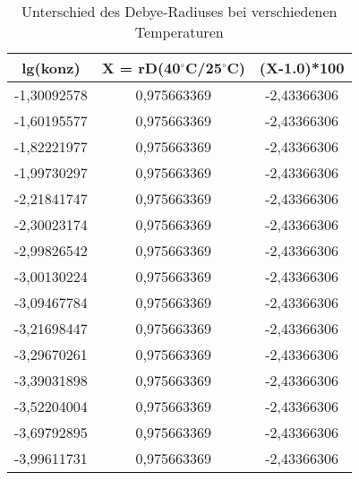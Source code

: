 \begin{table}[H]
  \centering
  \caption{Unterschied des Debye-Radiuses bei verschiedenen Temperaturen}
    \begin{tabular}{ccc}
    \toprule
    \multicolumn{1}{c}{\textbf{lg(konz)}} & \multicolumn{1}{p{6.785em}}{\textbf{\qquad X = \newline{}rD(40$^\circ$C/25$^\circ$C)}} & \multicolumn{1}{c}{\textbf{(X-1.0)*100}} \\
    \midrule
    -1,30092578 & 0,975663369 & -2,43366306 \\
    -1,60195577 & 0,975663369 & -2,43366306 \\
    -1,82221977 & 0,975663369 & -2,43366306 \\
    -1,99730297 & 0,975663369 & -2,43366306 \\
    -2,21841747 & 0,975663369 & -2,43366306 \\
    -2,30023174 & 0,975663369 & -2,43366306 \\
    -2,99826542 & 0,975663369 & -2,43366306 \\
    -3,00130224 & 0,975663369 & -2,43366306 \\
    -3,09467784 & 0,975663369 & -2,43366306 \\
    -3,21698447 & 0,975663369 & -2,43366306 \\
    -3,29670261 & 0,975663369 & -2,43366306 \\
    -3,39031898 & 0,975663369 & -2,43366306 \\
    -3,52204004 & 0,975663369 & -2,43366306 \\
    -3,69792895 & 0,975663369 & -2,43366306 \\
    -3,99611731 & 0,975663369 & -2,43366306 \\
    \bottomrule
    \end{tabular}%
  \label{tab:addlabel}%
\end{table}%


